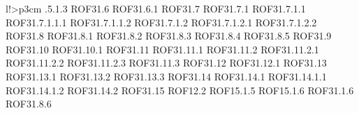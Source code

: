 \begin{tabella}{l!{\VRule}>{\centering\arraybackslash}p{3cm}}
.5.1.3 \linebreak ROF31.6 \linebreak ROF31.6.1 \linebreak ROF31.7 \linebreak ROF31.7.1 \linebreak ROF31.7.1.1 \linebreak ROF31.7.1.1.1 \linebreak ROF31.7.1.1.2 \linebreak ROF31.7.1.2 \linebreak ROF31.7.1.2.1 \linebreak ROF31.7.1.2.2 \linebreak ROF31.8 \linebreak ROF31.8.1 \linebreak ROF31.8.2 \linebreak ROF31.8.3 \linebreak ROF31.8.4 \linebreak ROF31.8.5 \linebreak ROF31.9 \linebreak ROF31.10 \linebreak ROF31.10.1 \linebreak ROF31.11 \linebreak ROF31.11.1 \linebreak ROF31.11.2 \linebreak ROF31.11.2.1 \linebreak ROF31.11.2.2 \linebreak ROF31.11.2.3 \linebreak ROF31.11.3 \linebreak ROF31.12 \linebreak ROF31.12.1 \linebreak ROF31.13 \linebreak ROF31.13.1 \linebreak ROF31.13.2 \linebreak ROF31.13.3 \linebreak ROF31.14 \linebreak ROF31.14.1 \linebreak ROF31.14.1.1 \linebreak ROF31.14.1.2 \linebreak ROF31.14.2 \linebreak ROF31.15 \linebreak ROF12.2 \linebreak ROF15.1.5 \linebreak ROF15.1.6 \linebreak ROF31.1.6 \linebreak ROF31.8.6 \\

\end{tabella}
